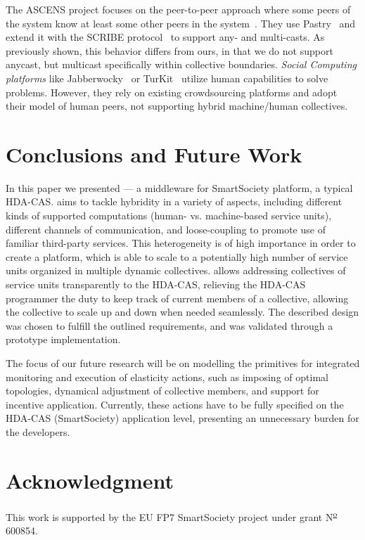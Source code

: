   The ASCENS project focuses on the peer-to-peer approach where some peers of the system know at least some other peers in the system~\cite{AutonomicCloud}. They use Pastry~\cite{Pastry} and extend it with the SCRIBE protocol~\cite{Scribe} to support any- and multi-casts. As previously shown, this behavior differs from ours, in that we do not support anycast, but multicast specifically within collective boundaries.
  \emph{Social Computing platforms} like Jabberwocky~\cite{Jabberwocky} or TurKit~\cite{Turkit} utilize human capabilities to solve problems. However, they rely on existing crowdsourcing platforms and adopt their model of human peers, not supporting hybrid machine/human collectives.


\section{Conclusions and Future Work}
\label{sec:conclusion}

  In this paper we presented \mdl{} --- a middleware for SmartSociety platform, a typical HDA-CAS. \mdl{} aims to tackle hybridity in a variety of aspects, including different kinds of supported computations (human- vs. machine-based service units), different channels of communication, and loose-coupling to promote use of familiar third-party services. This heterogeneity is of high importance in order to create a platform, which is able to scale to a potentially high number of service units organized in multiple dynamic collectives. \mdl{} allows addressing collectives of service units transparently to the HDA-CAS, relieving the HDA-CAS programmer the duty to keep track of current members of a collective, allowing the collective to scale up and down when needed seamlessly. The described design was chosen to fulfill the outlined requirements, and was validated through a prototype implementation. 

  The focus of our future research will be on modelling the primitives for integrated monitoring and execution of elasticity actions, such as imposing of optimal topologies, dynamical adjustment of collective members, and support for incentive application. Currently, these actions have to be fully specified on the HDA-CAS (SmartSociety) application level, presenting an unnecessary burden for the developers.







\section*{Acknowledgment}
This work is supported by the EU FP7 SmartSociety project under grant N\textsuperscript{\underline{o}} 600854.

